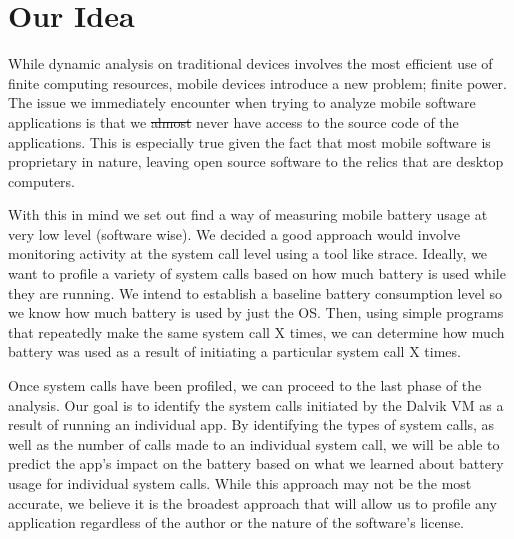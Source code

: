 \documentclass[11pt]{article}
\begin{document}
\section{Our Idea}

While dynamic analysis on traditional devices involves the most efficient use of finite 
computing resources, mobile devices introduce a new problem; finite power. The issue we 
immediately encounter when trying to analyze mobile software applications is that we 
\sout{almost} never have access to the source code of the applications. This is 
especially true given the fact that most mobile software is proprietary in nature, 
leaving open source software to the relics that are desktop computers.

With this in mind we set out find a way of measuring mobile battery usage at very low level
(software wise). We decided a good approach would involve monitoring activity at the system 
call level using a tool like strace. Ideally, we want to profile a variety of system calls 
based on how much battery is used while they are running. We intend to establish a baseline 
battery consumption level so we know how much battery is used by just the OS. Then, using 
simple programs that repeatedly make the same system call X times, we can determine how much 
battery was used as a result of initiating a particular system call X times.

Once system calls have been profiled, we can proceed to the last phase of the analysis. Our 
goal is to identify the system calls initiated by the Dalvik VM as a result of running an 
individual app. By identifying the types of system calls, as well as the number of calls made 
to an individual system call, we will be able to predict the app's impact on the battery based 
on what we learned about battery usage for individual system calls. While this approach may not 
be the most accurate, we believe it is the broadest approach that will allow us to profile any 
application regardless of the author or the nature of the software's license.




\end{document}
